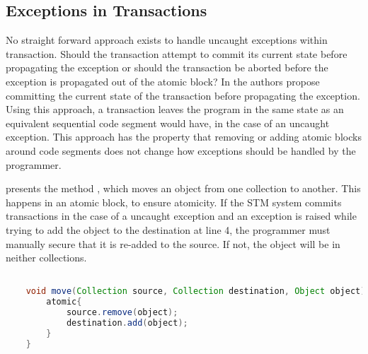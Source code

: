 \subsection{Exceptions in Transactions}
\label{subsec:stm:side_effects}
No straight forward approach exists to handle uncaught exceptions within transaction\cite[p. 80]{harris2010transactional}. Should the transaction attempt to commit its current state before propagating the exception or should the transaction be aborted before the exception is propagated out of the atomic block? In \cite{harris2003language} the authors propose committing the current state of the transaction before propagating the exception. Using this approach, a transaction leaves the program in the same state as an equivalent sequential code segment would have, in the case of an uncaught exception. This approach has the property that removing or adding atomic blocks around code segments does not change how exceptions should be handled by the programmer\cite[p. 79]{harris2010transactional}.

 presents the method , which moves an object from one collection to another. This happens in an atomic block, to ensure atomicity. If the \ac{STM} system commits transactions in the case of a uncaught exception and an exception is raised while trying to add the object to the destination at line 4, the programmer must manually secure that it is re-added to the source. If not, the object will be in neither collections.

\begin{lstlisting}[label=lst:stm_exception_new,
  caption={Exceptions in Transaction},
  language=Java,  
  showspaces=false,
  showtabs=false,
  breaklines=true,
  showstringspaces=false,
  breakatwhitespace=true,
  commentstyle=\color{greencomments},
  keywordstyle=\color{bluekeywords},
  stringstyle=\color{redstrings},
  morekeywords={atomic, retry, orElse}]  % Start your code-block

	void move(Collection source, Collection destination, Object object){
		atomic{
			source.remove(object);
			destination.add(object);
		}
	}      
\end{lstlisting}

